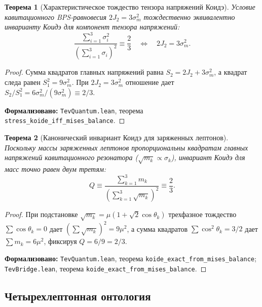 \documentclass[11pt,a4paper]{article}
\newtheorem{theorem}{Теорема}
\theoremstyle{definition}
\theoremstyle{remark}
\begin{document}
\begin{theorem}[Характеристическое тождество тензора напряжений Коидэ]
\label{thm:stress_koide_identity}
Условие кавитационного BPS-равновесия $2J_2 = 3\sigma_m^2$ тождественно эквивалентно инварианту Коидэ для компонент тензора напряжений:
\begin{equation}
    \frac{\sum_{i=1}^3 \sigma_i^2}{\left(\sum_{i=1}^3 \sigma_i\right)^2} \equiv \frac{2}{3} \quad \Longleftrightarrow \quad 2 J_2 = 3 \sigma_m^2.
    \label{eq:stress_tensor_koide_exact}
\end{equation}
\end{theorem}
\begin{proof}
Сумма квадратов главных напряжений равна $S_2 = 2J_2 + 3\sigma_m^2$, а квадрат следа равен $S_1^2 = 9\sigma_m^2$. При $2J_2 = 3\sigma_m^2$ отношение дает $S_2 / S_1^2 = 6\sigma_m^2 / (9\sigma_m^2) \equiv 2/3$.

\noindent\small\textbf{Формализовано:} \texttt{TevQuantum.lean}, теорема \texttt{stress_koide_iff_mises_balance}.
\end{proof}

\begin{theorem}[Канонический инвариант Коидэ для заряженных лептонов]
\label{thm:koide_exact_derivation}
Поскольку массы заряженных лептонов пропорциональны квадратам главных напряжений кавитационного резонатора ($\sqrt{m_k} \propto \sigma_k$), инвариант Коидэ для масс точно равен двум третям:
\begin{equation}
    Q \equiv \frac{\sum_{k=1}^3 m_k}{\left(\sum_{k=1}^3 \sqrt{m_k}\right)^2} \equiv \frac{2}{3}.
    \label{eq:koide_canonical_two_thirds}
\end{equation}
\end{theorem}
\begin{proof}
При подстановке $\sqrt{m_k} = \mu(1 + \sqrt{2}\cos\theta_k)$ трехфазное тождество $\sum \cos\theta_k = 0$ дает $(\sum \sqrt{m_k})^2 = 9\mu^2$, а сумма квадратов $\sum \cos^2\theta_k = 3/2$ дает $\sum m_k = 6\mu^2$, фиксируя $Q = 6/9 = 2/3$.

\noindent\small\textbf{Формализовано:} \texttt{TevQuantum.lean}, теорема \texttt{koide_exact_from_mises_balance}; \texttt{TevBridge.lean}, теорема \texttt{koide_exact_from_mises_balance}.
\end{proof}

\subsection{Четырехлептонная онтология}
\end{document}
